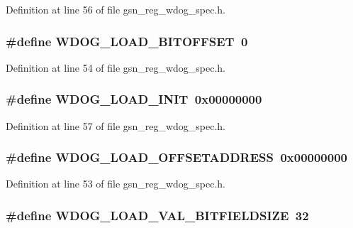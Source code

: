Definition at line 56 of file gsn\_\-reg\_\-wdog\_\-spec.h.

\hypertarget{a00577_ae6f564da0564f68efe50d10db0b88a9e}{
\subsubsection[{WDOG\_\-LOAD\_\-BITOFFSET}]{\setlength{\rightskip}{0pt plus 5cm}\#define WDOG\_\-LOAD\_\-BITOFFSET~0}}
\label{a00577_ae6f564da0564f68efe50d10db0b88a9e}


Definition at line 54 of file gsn\_\-reg\_\-wdog\_\-spec.h.

\hypertarget{a00577_a253f20484f02bacd0e5f3cb2678cae7b}{
\subsubsection[{WDOG\_\-LOAD\_\-INIT}]{\setlength{\rightskip}{0pt plus 5cm}\#define WDOG\_\-LOAD\_\-INIT~0x00000000}}
\label{a00577_a253f20484f02bacd0e5f3cb2678cae7b}


Definition at line 57 of file gsn\_\-reg\_\-wdog\_\-spec.h.

\hypertarget{a00577_a20047642a6650fc3db8b7c83e12e8161}{
\subsubsection[{WDOG\_\-LOAD\_\-OFFSETADDRESS}]{\setlength{\rightskip}{0pt plus 5cm}\#define WDOG\_\-LOAD\_\-OFFSETADDRESS~0x00000000}}
\label{a00577_a20047642a6650fc3db8b7c83e12e8161}


Definition at line 53 of file gsn\_\-reg\_\-wdog\_\-spec.h.

\hypertarget{a00577_abc3bf8eb7f0e24ddb67ea610dac16eef}{
\subsubsection[{WDOG\_\-LOAD\_\-VAL\_\-BITFIELDSIZE}]{\setlength{\rightskip}{0pt plus 5cm}\#define WDOG\_\-LOAD\_\-VAL\_\-BITFIELDSIZE~32}}
\label{a00577_abc3bf8eb7f0e24ddb67ea610dac16eef}


